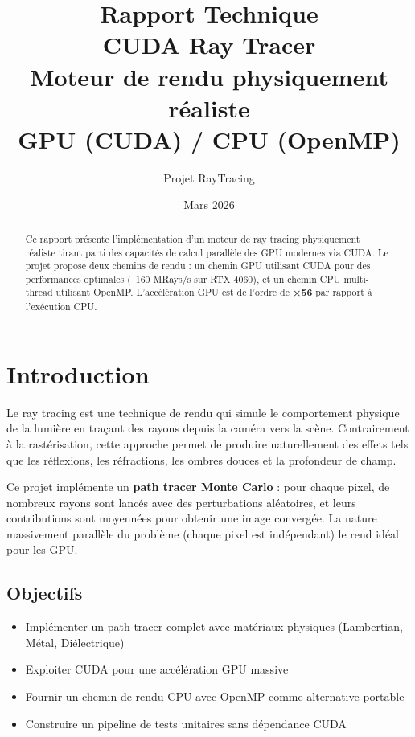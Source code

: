 \documentclass[12pt,a4paper]{article}
\title{
    \vspace{1cm}
    {\LARGE \textbf{Rapport Technique}} \\[0.5cm]
    {\Large CUDA Ray Tracer} \\[0.3cm]
    {\large Moteur de rendu physiquement réaliste} \\
    {\large GPU (CUDA) / CPU (OpenMP)}
    \vspace{0.5cm}
}
\author{Projet RayTracing}
\date{Mars 2026}
\begin{document}

\maketitle
\thispagestyle{empty}

\begin{abstract}
Ce rapport présente l'implémentation d'un moteur de ray tracing physiquement réaliste
tirant parti des capacités de calcul parallèle des GPU modernes via CUDA. Le projet
propose deux chemins de rendu : un chemin GPU utilisant CUDA pour des performances
optimales (~160 MRays/s sur RTX 4060), et un chemin CPU multi-thread utilisant
OpenMP. L'accélération GPU est de l'ordre de \textbf{×56} par rapport à l'exécution CPU.
\end{abstract}

\vspace{0.5cm}
\tableofcontents
\newpage

\section{Introduction}

Le ray tracing est une technique de rendu qui simule le comportement physique de la lumière
en traçant des rayons depuis la caméra vers la scène. Contrairement à la rastérisation,
cette approche permet de produire naturellement des effets tels que les réflexions,
les réfractions, les ombres douces et la profondeur de champ.

Ce projet implémente un \textbf{path tracer Monte Carlo} : pour chaque pixel, de nombreux
rayons sont lancés avec des perturbations aléatoires, et leurs contributions sont moyennées
pour obtenir une image convergée. La nature massivement parallèle du problème
(chaque pixel est indépendant) le rend idéal pour les GPU.

\subsection{Objectifs}

\begin{itemize}
    \item Implémenter un path tracer complet avec matériaux physiques (Lambertian, Métal, Diélectrique)
    \item Exploiter CUDA pour une accélération GPU massive
    \item Fournir un chemin de rendu CPU avec OpenMP comme alternative portable
    \item Construire un pipeline de tests unitaires sans dépendance CUDA
\end{itemize}
\end{document}
